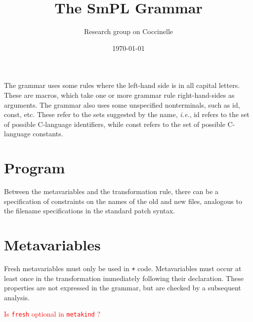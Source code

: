 \documentclass{article}
\title{The SmPL Grammar}
\author{Research group on Coccinelle}
\date{\today}
\newcommand{\mtt}[1]{\mbox{\tt{{#1}}}}
\newcommand{\fixme}[1]{{\textcolor{red}{#1}}}
\begin{document}
\maketitle



The grammar uses some rules where the left-hand side is in all capital
letters.  These are macros, which take one or more grammar rule
right-hand-sides as arguments.  The grammar also uses some unspecified
nonterminals, such as {\sf id}, {\sf const}, etc.  These refer to the sets
suggested by the name, {\em i.e.}, {\sf id} refers to the set of possible
C-language identifiers, while {\sf const} refers to the set of possible
C-language constants.

\section{Program}

\begin{grammar}
  
\end{grammar}

Between the metavariables and the transformation rule, there can be a
specification of constraints on the names of the old and new files,
analogous to the filename specifications in the standard patch syntax.

\section{Metavariables}

Fresh metavariables must only be used in {\tt +} code.  Metavariables must
occur at least once in the transformation immediately following their
declaration.  These properties are not expressed in the grammar, but are
checked by a subsequent analysis.

\fixme{Is \mtt{fresh} optional in \mtt{metakind} ?}
\end{document}
